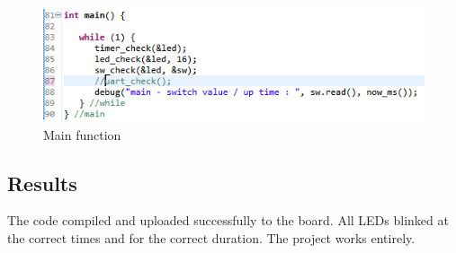 \documentclass{article}
\begin{document}
		 \begin{figure}[H]
			\centering
			\includegraphics[width=.6\linewidth]{CodeSC2}
			\caption{Main function}
			\label{fig:Code2}
		\end{figure}
	
	\subsection*{Results}
		The code compiled and uploaded successfully to the board. All LEDs blinked at the correct times and for the correct duration. The project works entirely.
\end{document}
